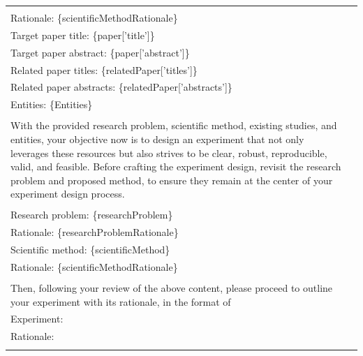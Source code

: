 \documentclass[11pt]{article}
\begin{document}
\begin{table}
{\begin{tabular}{ll}
{            \multicolumn{1}{p{.92\textwidth}}{{Scientific method: \{scientificMethod\}}} \\
            \multicolumn{1}{p{.92\textwidth}}{{Rationale: \{scientificMethodRationale\}}} \\
            \multicolumn{1}{p{.92\textwidth}}{{Target paper title: \{paper['title']\}}} \\
            \multicolumn{1}{p{.92\textwidth}}{{Target paper abstract: \{paper['abstract']\} }} \\
            \multicolumn{1}{p{.92\textwidth}}{{Related paper titles: \{relatedPaper['titles']\}}} \\
            \multicolumn{1}{p{.92\textwidth}}{{Related paper abstracts: \{relatedPaper['abstracts']\} }} \\
            \multicolumn{1}{p{.92\textwidth}}{{Entities: \{Entities\} }} \\ \\
            \multicolumn{1}{p{.92\textwidth}}{{With the provided research problem, scientific method, existing studies, and entities, your objective now is to design an experiment that not only leverages these resources but also strives to be clear, robust, reproducible, valid, and feasible. Before crafting the experiment design, revisit the research problem and proposed method, to ensure they remain at the center of your experiment design process.}} \\ \\
            \multicolumn{1}{p{.92\textwidth}}{{Research problem: \{researchProblem\}}} \\
            \multicolumn{1}{p{.92\textwidth}}{{Rationale: \{researchProblemRationale\}}} \\ 
            \multicolumn{1}{p{.92\textwidth}}{{Scientific method: \{scientificMethod\}}} \\
            \multicolumn{1}{p{.92\textwidth}}{{Rationale: \{scientificMethodRationale\}}} \\ \\
            \multicolumn{1}{p{.92\textwidth}}{{Then, following your review of the above content, please proceed to outline your experiment with its rationale, in the format of }} \\
            \multicolumn{1}{p{.92\textwidth}}{{Experiment: }} \\
            \multicolumn{1}{p{.92\textwidth}}{{Rationale: }} \\
        } \\
        \bottomrule
        \end{tabular}
    }
\end{table}
\end{document}
